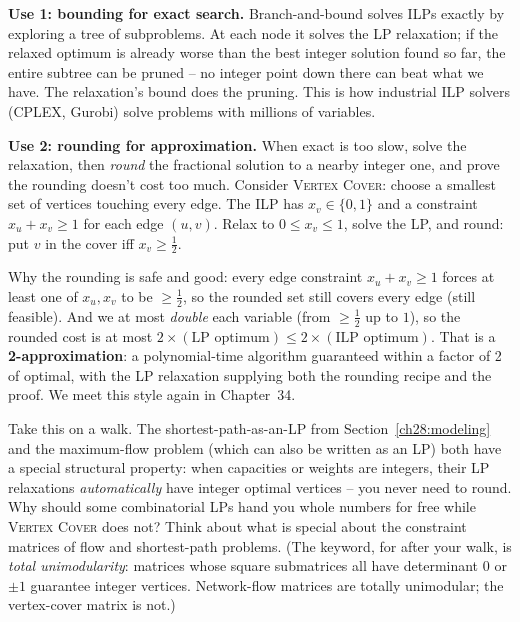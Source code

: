 \textbf{Use 1: bounding for exact search.} Branch-and-bound solves ILPs exactly
by exploring a tree of subproblems. At each node it solves the LP relaxation; if
the relaxed optimum is already worse than the best integer solution found so
far, the entire subtree can be pruned -- no integer point down there can beat
what we have. The relaxation's bound does the pruning. This is how industrial
ILP solvers (CPLEX, Gurobi) solve problems with millions of variables.

\textbf{Use 2: rounding for approximation.} When exact is too slow, solve the
relaxation, then \emph{round} the fractional solution to a nearby integer one,
and prove the rounding doesn't cost too much. Consider \textsc{Vertex Cover}:
choose a smallest set of vertices touching every edge. The ILP has $x_v \in
\{0,1\}$ and a constraint $x_u + x_v \ge 1$ for each edge $(u,v)$. Relax to
$0 \le x_v \le 1$, solve the LP, and round: put $v$ in the cover iff
$x_v \ge \tfrac12$.

\begin{focusbox}
Why the rounding is safe and good: every edge constraint $x_u + x_v \ge 1$
forces at least one of $x_u, x_v$ to be $\ge \tfrac12$, so the rounded set still
covers every edge (still feasible). And we at most \emph{double} each variable
(from $\ge\tfrac12$ up to $1$), so the rounded cost is at most
$2 \times (\text{LP optimum}) \le 2 \times (\text{ILP optimum})$. That is a
\textbf{2-approximation}: a polynomial-time algorithm guaranteed within a
factor of 2 of optimal, with the LP relaxation supplying both the rounding
recipe and the proof. We meet this style again in Chapter~34.
\end{focusbox}

\begin{walkbox}
Take this on a walk. The shortest-path-as-an-LP from
Section~\ref{ch28:modeling} and the maximum-flow problem (which can also be
written as an LP) both have a special structural property: when capacities or
weights are integers, their LP relaxations \emph{automatically} have integer
optimal vertices -- you never
need to round. Why should some combinatorial LPs hand you whole numbers for
free while \textsc{Vertex Cover} does not? Think about what is special about the
constraint matrices of flow and shortest-path problems. (The keyword, for
after your walk, is \emph{total unimodularity}: matrices whose square submatrices
all have determinant $0$ or $\pm1$ guarantee integer vertices. Network-flow
matrices are totally unimodular; the vertex-cover matrix is not.)
\end{walkbox}

